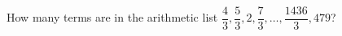 How many terms are in the arithmetic list $\dfrac{4}{3},\dfrac{5}{3},2,\dfrac{7}{3},\ldots,\dfrac{1436}{3},479$?
